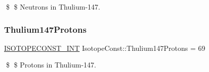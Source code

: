 \$ \$ Neutrons in Thulium-\/147. \mbox{\label{group___isotope_const-_thulium-_tm147_ga0ef0bbae9bfd63fa3b27004b4f3f456a}} 
\subsubsection{\texorpdfstring{Thulium147\+Protons}{Thulium147Protons}}
{\footnotesize\ttfamily \mbox{\hyperlink{group___isotope_const-_macros_ga5f18360b3e99483a35c32d789e62621c}{I\+S\+O\+T\+O\+P\+E\+C\+O\+N\+S\+T\+\_\+\+I\+NT}} Isotope\+Const\+::\+Thulium147\+Protons = 69}

\$ \$ Protons in Thulium-\/147. 